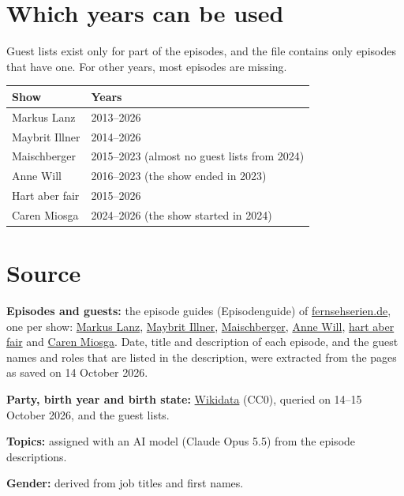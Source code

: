\documentclass[11pt]{article}
\begin{document}
\section*{Which years can be used}

Guest lists exist only for part of the episodes, and the file contains only episodes that have
one. For other years, most episodes are missing.

\begin{center}
\begin{tabular}{@{}ll@{}}
\toprule
\textbf{Show} & \textbf{Years} \\
\midrule
Markus Lanz & 2013--2026 \\
Maybrit Illner & 2014--2026 \\
Maischberger & 2015--2023 (almost no guest lists from 2024) \\
Anne Will & 2016--2023 (the show ended in 2023) \\
Hart aber fair & 2015--2026 \\
Caren Miosga & 2024--2026 (the show started in 2024) \\
\bottomrule
\end{tabular}
\end{center}

\section*{Source}

\textbf{Episodes and guests:} the episode guides (Episodenguide) of
\href{https://www.fernsehserien.de}{fernsehserien.de}, one per show:
\href{https://www.fernsehserien.de/markus-lanz/episodenguide}{Markus Lanz},
\href{https://www.fernsehserien.de/maybrit-illner/episodenguide}{Maybrit Illner},
\href{https://www.fernsehserien.de/maischberger-ard/episodenguide}{Maischberger},
\href{https://www.fernsehserien.de/anne-will/episodenguide}{Anne Will},
\href{https://www.fernsehserien.de/hart-aber-fair/episodenguide}{hart aber fair} and
\href{https://www.fernsehserien.de/caren-miosga/episodenguide}{Caren Miosga}.
Date, title and description of each episode, and the guest names and roles that are listed in the
description, were extracted from the pages as saved on 14 October 2026.

\textbf{Party, birth year and birth state:} \href{https://www.wikidata.org}{Wikidata} (CC0),
queried on 14--15 October 2026, and the guest lists.

\textbf{Topics:} assigned with an AI model (Claude Opus 5.5) from the episode descriptions.

\textbf{Gender:} derived from job titles and first names.
\end{document}
